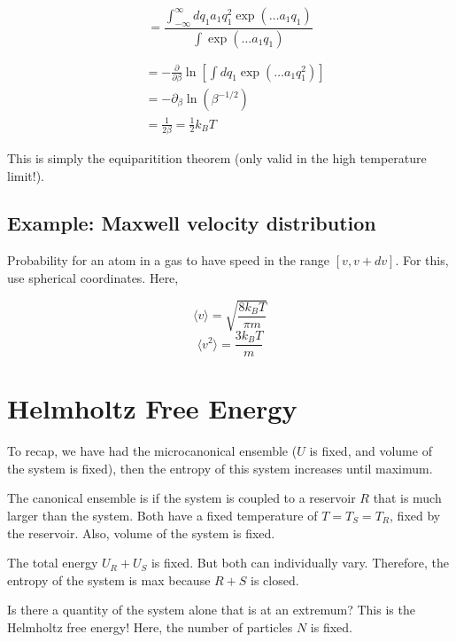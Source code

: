 \documentclass{article}
\newtheorem{one minute paper}[theorem]{One Minute Paper}
\begin{document}
\begin{equation}
    = \frac{\int_{-\infty}^{\infty} dq_1 a_1q_1^2 \exp(\dots a_1q_1)}{\int \exp(\dots a_1q_1)}
\end{equation}

\begin{align}
    &= -\frac{\partial}{\partial \beta}\ln \left[ \int dq_1 \exp(\dots a_1 q_1^2) \right] \\
    &= -\partial_{\beta}\ln \left( \beta^{-1/2} \right)\\
    &= \frac{1}{2\beta} = \frac{1}{2}k_B T
\end{align}

This is simply the equiparitition theorem (only valid in the high temperature limit!). 

\subsection*{Example: Maxwell velocity distribution}

Probability for an atom in a gas to have speed in the range $[v, v + dv]$. For this, use spherical coordinates. Here, 

\begin{equation}
    \langle v \rangle = \sqrt{\frac{8 k_B T}{\pi m}}
\end{equation}
\begin{equation}
    \langle v^2 \rangle = \frac{3k_B T}{m}
\end{equation}

\section*{Helmholtz Free Energy}

To recap, we have had the microcanonical ensemble ($U$ is fixed, and volume of the system is fixed), then the entropy of this system increases until maximum. 

The canonical ensemble is if the system is coupled to a reservoir $R$ that is much larger than the system. Both have a fixed temperature of $T = T_S = T_R$, fixed by the reservoir. Also, volume of the system is fixed. 

The total energy $U_R + U_S$ is fixed. But both can individually vary. Therefore, the entropy of the system is max because $R + S$ is closed.

Is there a quantity of the system alone that is at an extremum? This is the Helmholtz free energy! Here, the number of particles $N$ is fixed. 
\end{document}
